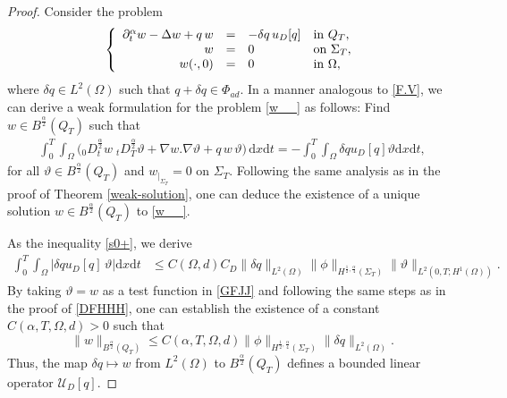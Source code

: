 \documentclass[a4paper,12pt,reqno,natbib]{amsart}
\newcommand{\dx} {\displaystyle\mathrm{d}x}
\newcommand{\dt} {\displaystyle\mathrm{d}t}
\begin{document}
\begin{proof}
Consider the problem
\begin{eqnarray} \label{w__}
\left\{
  \begin{array}{rcll}
    \partial_{t} ^{\alpha}  w-\Delta w +q\,  w&=& -\delta q\, u_D[q] &\hbox{in}\ Q_T, \\
      w &=&0 &\hbox{on}\  \Sigma_T, \\
    \displaystyle  w(\cdot,0)&=&0  &\hbox{in}\ \Omega,
  \end{array}
\right.
\end{eqnarray}
where $\delta q\in L^2(\Omega)$ such that $q+\delta q \in \Phi_{ad}$. In a manner analogous to \eqref{F.V}, we can derive a weak formulation for the problem \eqref{w__} as follows: Find $w\in B^{\frac{\alpha}{2}}(Q_T)$ such that
\begin{align}\label{GFJJ}\int_0^T\int_{\Omega}\Big({}_0D^{\frac{\alpha}{2}}_t w\; {}_tD^{\frac{\alpha}{2}}_T\vartheta +\nabla w.\nabla\vartheta +q\,  w\,\vartheta\Big)\, \dx \dt=-\int_0^T\int_{\Omega}\delta q u_D[q]\vartheta \dx \dt,
\end{align}
for all $\vartheta\in B^{\frac{\alpha}{2}}(Q_T)$ and $w_{|_{\Sigma_T}}=0$ on $\Sigma_T$. Following the same analysis as in the proof of Theorem \ref{weak-solution}, one can deduce the existence of a unique solution $w\in B^\frac{\alpha}{2}(Q_T)$ to \eqref{w__}.
\vspace{0.1 cm}

\noindent As the inequality \eqref{s0+}, we derive
\begin{align*} %
\int_0^T\int_\Omega\Big|\delta q u_D [q]\, \vartheta\Big|\dx\dt&\leq C(\Omega,d)C_D
\|\delta q\|_{L^2(\Omega)}\|\phi\|_{H^{\frac{1}{2}, \frac{\alpha}{4} }(\Sigma_T)}\|\vartheta\|_{L^2(0,T;H^1(\Omega))}.
\end{align*}
By taking $\vartheta=w$ as a test function in \eqref{GFJJ} and following the same steps as in the proof of \eqref{DFHHH}, one can establish the existence of a constant $C(\alpha,T,\Omega,d)>0$ such that
\begin{equation*}%
    \| w\|_{B^{\frac{\alpha}{2}}(Q_T)}\leq C(\alpha,T,\Omega,d)\|\phi\|_{H^{\frac{1}{2}, \frac{\alpha}{4} }(\Sigma_T)}\|\delta q \|_{ L^2(\Omega)}.
\end{equation*}
Thus, the map $\delta q \mapsto w$ from $L^2(\Omega)$ to $B^{\frac{\alpha}{2}}(Q_T)$ defines a bounded linear operator $\mathcal{U}_D[q]$.





\end{proof}
\end{document}
